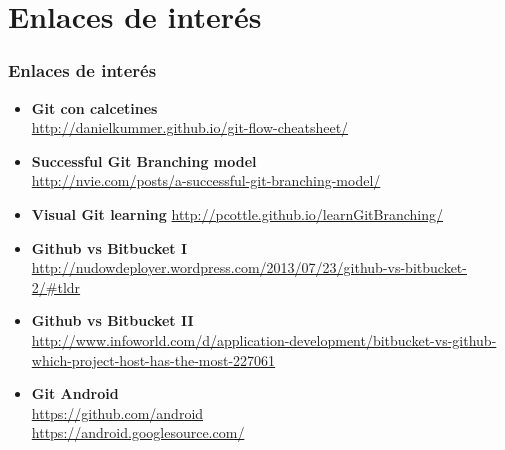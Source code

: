 \section{Enlaces de interés}
\frame
{
\frametitle{Enlaces de interés}
\begin{itemize}
\item \textbf{Git con calcetines}\\ \url{http://danielkummer.github.io/git-flow-cheatsheet/}
\item \textbf{Successful Git Branching model}\\ \url{http://nvie.com/posts/a-successful-git-branching-model/}
\item \textbf{Visual Git learning} \url{http://pcottle.github.io/learnGitBranching/}
\item \textbf{Github vs Bitbucket I}\\ \url{http://nudowdeployer.wordpress.com/2013/07/23/github-vs-bitbucket-2/\#tldr}
\item \textbf{Github vs Bitbucket II}\\ \url{http://www.infoworld.com/d/application-development/bitbucket-vs-github-which-project-host-has-the-most-227061}
\item \textbf{Git Android}\\ \url{https://github.com/android}\\ \url{https://android.googlesource.com/}
\end{itemize}
}